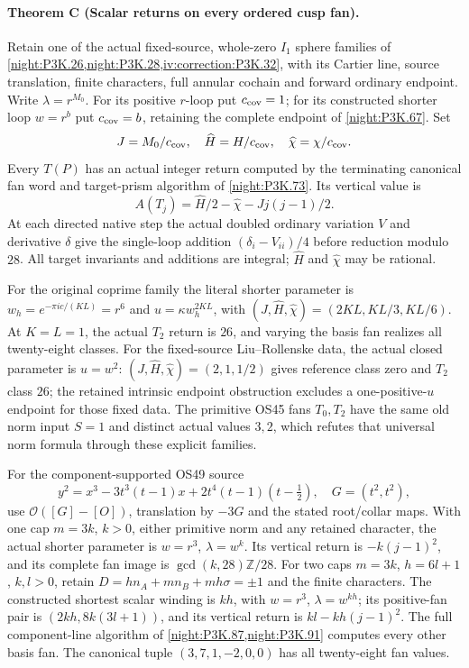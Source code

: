 \paragraph{Theorem C (Scalar returns on every ordered cusp fan).}
\label{series:IV:C}
Retain one of the actual fixed-source, whole-zero $I_1$ sphere families
of \cref{night:P3K.26,night:P3K.28,iv:correction:P3K.32}, with
its Cartier line, source translation, finite characters, full annular
cochain and forward ordinary endpoint. Write $\lambda=r^{M_0}$.
For its positive $r$-loop put $c_{\rm cov}=1$; for its constructed
shorter loop $w=r^b$ put $c_{\rm cov}=b$, retaining the complete
endpoint of \cref{night:P3K.67}. Set
\[
 J=M_0/c_{\rm cov},\quad \widehat H=H/c_{\rm cov},\quad
 \widehat\chi=\chi/c_{\rm cov}.
\]
Every $T(P)$ has an actual integer return computed by the terminating
canonical fan word and target-prism algorithm of
\cref{night:P3K.73}. Its vertical value is
\[
 A(T_j)=\widehat H/2-\widehat\chi-Jj(j-1)/2.
\]
At each directed native step the actual doubled ordinary variation
$V$ and derivative $\delta$ give the single-loop addition
$(\delta_i-V_{ii})/4$ before reduction modulo $28$.
All target invariants and additions are integral; $\widehat H$ and
$\widehat\chi$ may be rational.

For the original coprime family the literal shorter parameter is
$w_h=e^{-\pi i c/(KL)}=r^6$ and
$u=\kappa w_h^{2KL}$, with
$(J,\widehat H,\widehat\chi)=(2KL,KL/3,KL/6)$.
At $K=L=1$, the actual $T_2$ return is $26$, and varying the basis
fan realizes all twenty-eight classes. For the fixed-source
Liu--Rollenske data, the actual closed parameter is $u=w^2$:
$(J,\widehat H,\widehat\chi)=(2,1,1/2)$ gives reference class zero
and $T_2$ class $26$; the retained intrinsic endpoint obstruction
excludes a one-positive-$u$ endpoint for those fixed data.
The primitive OS45 fans $T_0,T_2$ have the same old norm input
$S=1$ and distinct actual values $3,2$, which refutes that universal
norm formula through these explicit families.

For the component-supported OS49 source
\[
 y^2=x^3-3t^3(t-1)x+2t^4(t-1)(t-\tfrac12),\quad G=(t^2,t^2),
\]
use $\mathcal O([G]-[O])$, translation by $-3G$ and the stated
root/collar maps. With one cap $m=3k$, $k>0$, either primitive
norm and any retained character, the actual shorter parameter is
$w=r^3$, $\lambda=w^k$. Its vertical return is
$-k(j-1)^2$, and its complete fan image is
$\gcd(k,28)\mathbb Z/28$.
For two caps $m=3k$, $h=6l+1$, $k,l>0$, retain
$D=hn_A+mn_B+mh\sigma=\pm1$ and the finite characters.
The constructed shortest scalar winding is $kh$, with
$w=r^3$, $\lambda=w^{kh}$; its positive-fan pair is
$(2kh,8k(3l+1))$, and its vertical return is
$kl-kh(j-1)^2$. The full component-line algorithm of
\cref{night:P3K.87,night:P3K.91} computes every other basis fan.
The canonical tuple $(3,7,1,-2,0,0)$ has all twenty-eight fan values.

